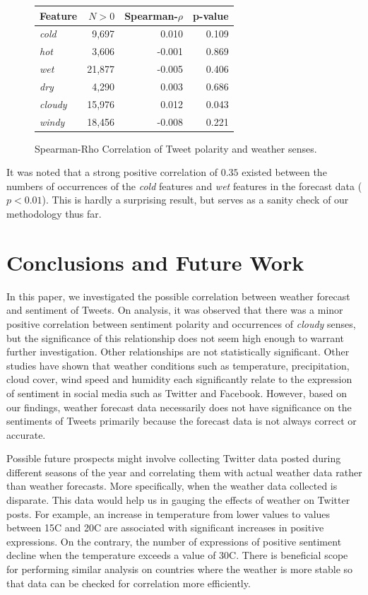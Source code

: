 \documentclass[a4paper,10pt]{article}
\begin{document}
    \begin{figure}
        \begin{tabular}{l | r r r }
        \textbf{Feature} & \textbf{$N > 0$} & \textbf{Spearman-$\rho$} & \textbf{p-value} \\
        \hline
        \textit{cold} & 9,697 & 0.010 & 0.109 \\
        \textit{hot} & 3,606 & -0.001 & 0.869 \\
        \textit{wet} & 21,877 & -0.005 & 0.406 \\
        \textit{dry} & 4,290 & 0.003 & 0.686 \\
        \textit{cloudy} & 15,976 & 0.012 & 0.043 \\
        \textit{windy} & 18,456 & -0.008 & 0.221 \\
        \end{tabular}
        \caption{Spearman-Rho Correlation of Tweet polarity and weather senses.}
        \label{fig:stats2}
    \end{figure}
    
    It was noted that a strong positive correlation of $0.35$ existed between the numbers of occurrences of the \textit{cold} features and \textit{wet} features in the forecast data ($p<0.01$). This is hardly a surprising result, but serves as a sanity check of our methodology thus far.

    \section{Conclusions and Future Work}
    \label{conclusion}
     In this paper, we investigated the possible correlation between weather forecast and sentiment of Tweets. On analysis, it was observed that there was a minor positive correlation between sentiment polarity and occurrences of \textit{cloudy} senses, but the significance of this relationship does not seem high enough to warrant further investigation. Other relationships are not statistically significant. Other studies have shown that weather conditions such as temperature, precipitation, cloud cover, wind speed and humidity each significantly relate to the expression of sentiment in social media such as Twitter and Facebook. However, based on our findings, weather forecast data necessarily does not have significance on the sentiments of Tweets primarily because the forecast data is not always correct or accurate.

     Possible future prospects might involve collecting Twitter data posted during different seasons of the year and correlating them with actual weather data rather than weather forecasts. More specifically, when the weather data collected is disparate. This data would help us in gauging the effects of weather on Twitter posts.  For example, an increase in temperature from lower values to values between 15C and 20C are associated with significant increases in positive expressions. On the contrary, the number of expressions of positive sentiment decline when the temperature exceeds a value of 30C. There is beneficial scope for performing similar analysis on countries where the weather is more stable so that data can be checked for correlation more efficiently.

    \printbibliography
\end{document}
